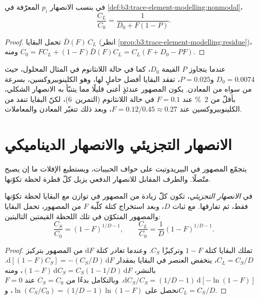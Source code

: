 \begin{proposition}\label{prop:b3:trace-element-modelling:nonmodal}
في  بنسب الانصهار $p_i$ المعرّفة في \cref{def:b3:trace-element-modelling:nonmodal}،
\[
\frac{C_L}{C_0} = \frac{1}{D_0 + F(1 - P)}.
\]
\end{proposition}

\begin{proof}
تحمل البقايا $\bar D(F)\,C_L$ (انظر \cref{prop:b3:trace-element-modelling:residue})،
ومنه $C_0 = FC_L + (1 - F)\bar D(F)C_L = C_L(F + D_0 - PF)$.
\end{proof}

عندما يتجاوز $P$ القيمة $D_0$، كما في حالة اللانثانوم في المثال المحلول، حيث $D_0 =
0.0074$ و$P = 0.025$، تفقد البقايا أفضل حاملٍ لها، وهو الكلينوبيروكسين، بسرعة
من سواه من المعادن. يكون المصهور عندئذٍ أغنى قليلًا مما يتنبّأ به الانصهار الشكلي،
بأقلّ من \qty{2}{\percent} عند $F = 0.1$ في حالة اللانثانوم (التمرين~6)، لكنّ
البقايا تنفد من الكلينوبيروكسين عند $F = 0.12/0.45 \approx 0.27$، وبعد ذلك
تتغيّر المعادن والمعاملات.

\section{الانصهار التجزيئي والانصهار الديناميكي}\label{sec:b3:trace-element-modelling:fractional}

يتجمّع المصهور في البيريدوتيت على حواف الحبيبات، ويستطيع الإفلات ما إن يصبح
متّصلًا. والطرف المقابل للانصهار الدفعي يزيل كلّ قطرة
لحظة تكوّنها.

\begin{theorem}\label{thm:b3:trace-element-modelling:fractional}
في \emph{الانصهار التجزيئي}، تكون كلّ زيادة من المصهور
في توازن مع البقايا لحظة تكوّنها فقط، ثم تفارقها.
مع ثبات $D$، وبعد استخراج كتلة كلّية $F$ من المصهور، تحمل البقايا
والمصهور المتكوّن في تلك اللحظة القيمتين التاليتين:
\[
\frac{C_S}{C_0} = (1 - F)^{1/D - 1}, \qquad
\frac{C_L}{C_0} = \frac{1}{D}(1 - F)^{1/D - 1}.
\]
\end{theorem}

\begin{proof}
تملك البقايا كتلة $1 - F$ وتركيزًا $C_S$. وعندما تغادر كتلة
$\mathrm dF$ من المصهور بتركيز $C_L = C_S/D$، ينخفض العنصر في البقايا
بمقدار $\mathrm d[(1 - F)C_S] = -(C_S/D)\,\mathrm dF$. بالنشر،
$(1 - F)\,\mathrm dC_S = C_S(1 - 1/D)\,\mathrm dF$، ومنه
$\mathrm dC_S/C_S = (1/D - 1)\,\mathrm d[-\ln(1 - F)]$. وبالتكامل بدءًا من
$C_S = C_0$ عند $F = 0$ نحصل على $\ln(C_S/C_0) = (1/D - 1)\ln(1 - F)$،
و$C_L = C_S/D$.
\end{proof}


